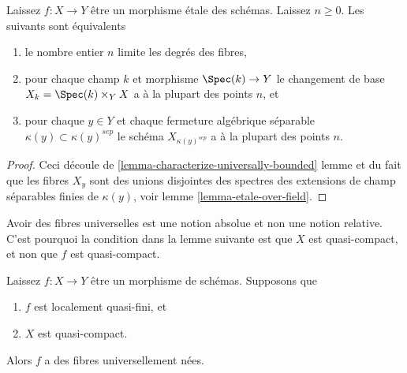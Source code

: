 \begin{lemma}

\label{lemma-etale-universally-bounded}
Laissez $f : X \to Y$ être un morphisme \'etale des schémas. Laissez $n \geq 0$. Les suivants sont équivalents
\begin{enumerate}
\item le nombre entier $n$ limite les degrés des fibres,
\item pour chaque champ $k$ et morphisme $\Spec(k) \to Y$ le changement de base $X_k = \Spec(k) \times_Y X$ a à la plupart des points $n$, et
\item pour chaque $y \in Y$ et chaque fermeture algébrique séparable $\kappa(y) \subset \kappa(y)^{sep}$ le schéma $X_{\kappa(y)^{sep}}$ a à la plupart des points $n$.
\end{enumerate}

\end{lemma}

\begin{proof}
Ceci découle de \ref{lemma-characterize-universally-bounded} lemme et du fait que les fibres $X_y$ sont des unions disjointes des spectres des extensions de champ séparables finies de $\kappa(y)$, voir lemme \ref{lemma-etale-over-field}.
\end{proof}

\noindent
Avoir des fibres universelles est une notion absolue et non une notion relative. C'est pourquoi la condition dans la lemme suivante est que $X$ est quasi-compact, et non que $f$ est quasi-compact.

\begin{lemma}

\label{lemma-locally-quasi-finite-qc-source-universally-bounded}
Laissez $f : X \to Y$ être un morphisme de schémas. Supposons que
\begin{enumerate}
\item $f$ est localement quasi-fini, et
\item $X$ est quasi-compact.
\end{enumerate}
Alors $f$ a des fibres universellement nées.
\end{lemma}


